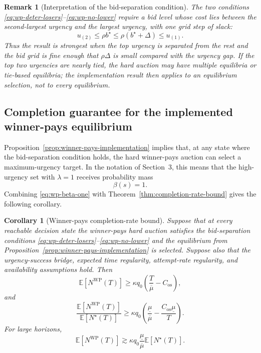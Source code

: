 \documentclass[11pt]{article}
\newtheorem{corollary}{Corollary}
\newtheorem{remark}{Remark}
\newcommand{\E}{\mathbb{E}}
\begin{document}
\begin{remark}[Interpretation of the bid-separation condition]
The two conditions \eqref{eq:wp-deter-losers}--\eqref{eq:wp-no-lower} require a bid level whose cost lies between the
second-largest urgency and the largest urgency, with one grid step of slack:
\begin{equation}
  u_{(2)} \le \rho b^\star \le \rho(b^\star+\Delta) \le u_{(1)}.
  \label{eq:wp-gap-interpretation}
\end{equation}
Thus the result is strongest when the top urgency is separated from the rest and the bid grid is fine enough that
$\rho\Delta$ is small compared with the urgency gap. If the top two urgencies are nearly tied, the hard auction may
have multiple equilibria or tie-based equilibria; the implementation result then applies to an equilibrium selection,
not to every equilibrium.
\end{remark}

\subsection{Completion guarantee for the implemented winner-pays equilibrium}

Proposition~\ref{prop:winner-pays-implementation} implies that, at any state where the bid-separation condition holds,
the hard winner-pays auction can select a maximum-urgency target. In the notation of Section~3, this means that the
high-urgency set with $\lambda=1$ receives probability mass
\begin{equation}
  \beta(s)=1.
  \label{eq:wp-beta-one}
\end{equation}
Combining \eqref{eq:wp-beta-one} with Theorem~\ref{thm:completion-rate-bound} gives the following corollary.

\begin{corollary}[Winner-pays completion-rate bound]
\label{cor:winner-pays-completion}
Suppose that at every reachable decision state the winner-pays hard auction satisfies the bid-separation conditions
\eqref{eq:wp-deter-losers}--\eqref{eq:wp-no-lower} and the equilibrium from Proposition~\ref{prop:winner-pays-implementation}
is selected. Suppose also that the urgency-success bridge, expected time regularity, attempt-rate regularity, and
availability assumptions hold. Then
\begin{equation}
  \E[N^{\mathrm{WP}}(T)]
  \ge
  \kappa q_0
  \left(\frac{T}{\overline\mu}-C_{\mathrm{os}}\right),
  \label{eq:wp-ne-completions-lower}
\end{equation}
and
\begin{equation}
  \frac{\E[N^{\mathrm{WP}}(T)]}{\E[N^\star(T)]}
  \ge
  \kappa q_0
  \left(
    \frac{\underline\mu}{\overline\mu}
    -
    \frac{C_{\mathrm{os}}\underline\mu}{T}
  \right).
  \label{eq:wp-main-ratio-bound}
\end{equation}
For large horizons,
\begin{equation}
  \E[N^{\mathrm{WP}}(T)]
  \gtrsim
  \kappa q_0\frac{\underline\mu}{\overline\mu}\E[N^\star(T)].
  \label{eq:wp-asymptotic-bound}
\end{equation}
\end{corollary}
\end{document}
